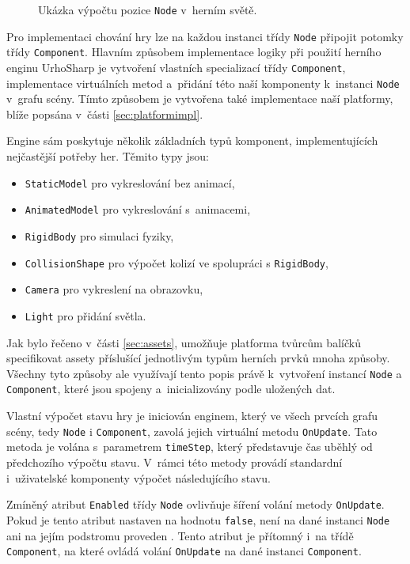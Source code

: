 \begin{figure}[h]
	\centering
	\fontsize{8pt}{11pt}\selectfont
	\def\svgwidth{\textwidth}
	
	\caption{Ukázka výpočtu pozice \texttt{Node} v~herním světě.}
	\label{fig:relativeposition}
\end{figure}

Pro implementaci chování hry lze na každou instanci třídy \texttt{Node} připojit potomky třídy \texttt{Component}. Hlavním způsobem implementace logiky při použití herního enginu UrhoSharp je vytvoření vlastních specializací třídy \texttt{Component}, implementace virtuálních metod a~přidání této naší komponenty k~instanci \texttt{Node} v~grafu scény. Tímto způsobem je vytvořena také implementace naší platformy, blíže popsána v~části \ref{sec:platformimpl}. 

Engine sám poskytuje několik základních typů komponent, implementujících nejčastější potřeby her. Těmito typy jsou:

\begin{itemize}
	\item \texttt{StaticModel} pro vykreslování bez animací,
	\item \texttt{AnimatedModel} pro vykreslování s~animacemi,
	\item \texttt{RigidBody} pro simulaci fyziky,
	\item \texttt{CollisionShape} pro výpočet kolizí ve spolupráci s \texttt{RigidBody},
	\item \texttt{Camera} pro vykreslení na obrazovku,
	\item \texttt{Light} pro přidání světla.
\end{itemize}

Jak bylo řečeno v~části \ref{sec:assets}, umožňuje platforma tvůrcům balíčků specifikovat assety příslušící jednotlivým typům herních prvků mnoha způsoby. Všechny tyto způsoby ale využívají tento popis právě k~vytvoření instancí \texttt{Node} a \texttt{Component}, které jsou spojeny a~inicializovány podle uložených dat. 

Vlastní výpočet stavu hry je iniciován enginem, který ve všech prvcích grafu scény, tedy \texttt{Node} i \texttt{Component}, zavolá jejich virtuální metodu \texttt{OnUpdate}. Tato metoda je volána s~parametrem \texttt{timeStep}, který představuje čas uběhlý od předchozího výpočtu stavu. V~rámci této metody provádí standardní i~uživatelské komponenty výpočet následujícího stavu.

Zmíněný atribut \texttt{Enabled} třídy \texttt{Node} ovlivňuje šíření volání metody \texttt{OnUpdate}. Pokud je tento atribut nastaven na hodnotu \texttt{false}, není na dané instanci \texttt{Node} ani na jejím podstromu proveden . Tento atribut je přítomný i~na třídě \texttt{Component}, na které ovládá volání \texttt{OnUpdate} na dané instanci \texttt{Component}.

